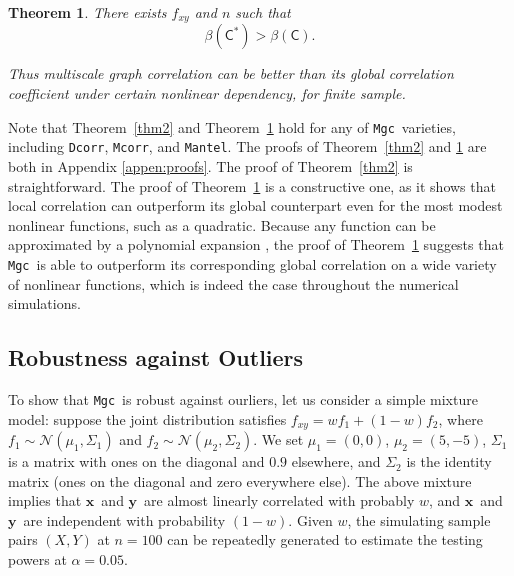 \documentclass[11pt]{article}
\providecommand{\sct}[1]{{\sc \texttt{#1}}}
\providecommand{\mb}[1]{\boldsymbol{#1}}
\providecommand{\mc}[1]{\mathcal{#1}}
\newcommand{\G}{\mathsf{C}}
\newcommand{\T}{^{\ensuremath{\mathsf{T}}}}           %
\newcommand{\Mgc}{\sct{Mgc}}
\newcommand{\Dcorr}{\sct{Dcorr}}
\newcommand{\Mcorr}{\sct{Mcorr}}
\newcommand{\Mantel}{\sct{Mantel}}
\newcommand{\mbx}{\ensuremath{\mb{x}}}
\newcommand{\mby}{\ensuremath{\mb{y}}}
\newtheorem{thm}{Theorem}
\begin{document}
\begin{thm}
\label{thm3}
There exists $f_{xy}$ and $n$ such that 
\begin{equation}
\beta(\G^{*}) > \beta(\G).
\end{equation}

Thus multiscale graph correlation can be better than its global correlation coefficient under certain nonlinear dependency, for finite sample.
\end{thm}
Note that Theorem~\ref{thm2} and Theorem~\ref{thm3} hold for any of \Mgc~varieties, including  \Dcorr, \Mcorr, and \Mantel.
% 
The proofs of Theorem~\ref{thm2} and \ref{thm3} are both in Appendix \ref{appen:proofs}.  The proof of Theorem~\ref{thm2} is straightforward.  The proof of Theorem~\ref{thm3} is a constructive one, as it shows that local correlation can outperform its global counterpart even for the most modest nonlinear functions, such as a quadratic.  Because any function can be approximated by a polynomial expansion \cite{RudinBook}, the proof of Theorem~\ref{thm3} suggests that \Mgc~is able to outperform its corresponding global correlation on a wide variety of nonlinear functions, which is indeed the case throughout the numerical simulations.


\subsection{Robustness against Outliers}
\label{main4}
To show that \Mgc~is robust against ourliers, let us consider a simple mixture model: suppose the joint distribution satisfies $f_{xy}=w f_{1}+(1-w) f_{2}$, where $f_{1} \sim \mc{N}(\mu_{1},\Sigma_{1})$ and $f_{2} \sim \mc{N}(\mu_{2},\Sigma_{2})$. We set $\mu_{1}=(0,0)$, $\mu_{2}=(5,-5)$, $\Sigma_{1}$ is a matrix with ones on the diagonal and $0.9$ elsewhere, 
 and $\Sigma_{2}$ is the identity matrix (ones on the diagonal and zero everywhere else). 
 The above mixture implies that \mbx~and \mby~are almost linearly correlated with probably $w$, and \mbx~and \mby~are independent with probability $(1-w)$. Given $w$, the simulating sample pairs $(X,Y)$ at $n=100$ can be repeatedly generated to estimate the testing powers at $\alpha=0.05$. 
\end{document}
